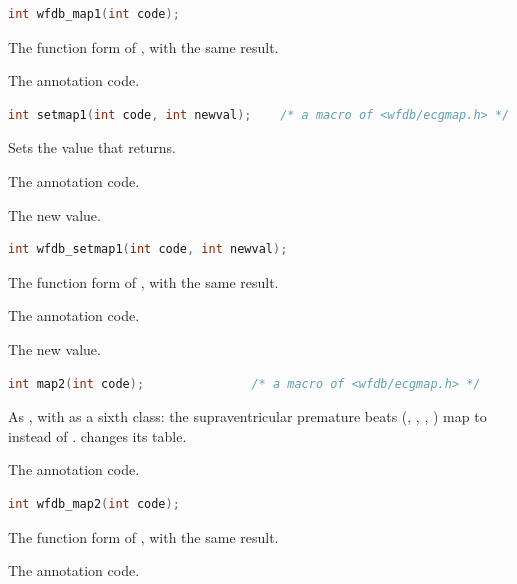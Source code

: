 \begin{lstlisting}[language=C,style=signature]
int wfdb_map1(int code);
\end{lstlisting}
The function form of , with the same result.
\begin{params}
\item[code] The annotation code.
\end{params}

\begin{lstlisting}[language=C,style=signature]
int setmap1(int code, int newval);    /* a macro of <wfdb/ecgmap.h> */
\end{lstlisting}
Sets the value that  returns.
\begin{params}
\item[code] The annotation code.
\item[newval] The new value.
\end{params}

\begin{lstlisting}[language=C,style=signature]
int wfdb_setmap1(int code, int newval);
\end{lstlisting}
The function form of , with the same result.
\begin{params}
\item[code] The annotation code.
\item[newval] The new value.
\end{params}

\begin{lstlisting}[language=C,style=signature]
int map2(int code);               /* a macro of <wfdb/ecgmap.h> */
\end{lstlisting}
As , with  as a sixth class: the supraventricular
premature beats (, , , ) map to
 instead of .  changes its table.
\begin{params}
\item[code] The annotation code.
\end{params}

\begin{lstlisting}[language=C,style=signature]
int wfdb_map2(int code);
\end{lstlisting}
The function form of , with the same result.
\begin{params}
\item[code] The annotation code.
\end{params}

